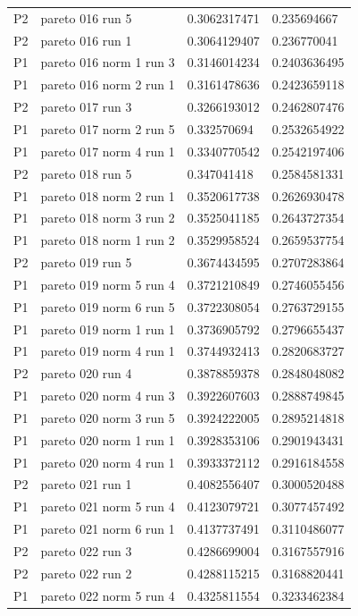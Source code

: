 \begin{tabular}{@{}llll@{}}
P2 & pareto 016 run 5 & 0.3062317471 & 0.235694667 \\
P2 & pareto 016 run 1 & 0.3064129407 & 0.236770041 \\
P1 & pareto 016 norm 1 run 3 & 0.3146014234 & 0.2403636495 \\
P1 & pareto 016 norm 2 run 1 & 0.3161478636 & 0.2423659118 \\
P2 & pareto 017 run 3 & 0.3266193012 & 0.2462807476 \\
P1 & pareto 017 norm 2 run 5 & 0.332570694 & 0.2532654922 \\
P1 & pareto 017 norm 4 run 1 & 0.3340770542 & 0.2542197406 \\
P2 & pareto 018 run 5 & 0.347041418 & 0.2584581331 \\
P1 & pareto 018 norm 2 run 1 & 0.3520617738 & 0.2626930478 \\
P1 & pareto 018 norm 3 run 2 & 0.3525041185 & 0.2643727354 \\
P1 & pareto 018 norm 1 run 2 & 0.3529958524 & 0.2659537754 \\
P2 & pareto 019 run 5 & 0.3674434595 & 0.2707283864 \\
P1 & pareto 019 norm 5 run 4 & 0.3721210849 & 0.2746055456 \\
P1 & pareto 019 norm 6 run 5 & 0.3722308054 & 0.2763729155 \\
P1 & pareto 019 norm 1 run 1 & 0.3736905792 & 0.2796655437 \\
P1 & pareto 019 norm 4 run 1 & 0.3744932413 & 0.2820683727 \\
P2 & pareto 020 run 4 & 0.3878859378 & 0.2848048082 \\
P1 & pareto 020 norm 4 run 3 & 0.3922607603 & 0.2888749845 \\
P1 & pareto 020 norm 3 run 5 & 0.3924222005 & 0.2895214818 \\
P1 & pareto 020 norm 1 run 1 & 0.3928353106 & 0.2901943431 \\
P1 & pareto 020 norm 4 run 1 & 0.3933372112 & 0.2916184558 \\
P2 & pareto 021 run 1 & 0.4082556407 & 0.3000520488 \\
P1 & pareto 021 norm 5 run 4 & 0.4123079721 & 0.3077457492 \\
P1 & pareto 021 norm 6 run 1 & 0.4137737491 & 0.3110486077 \\
P2 & pareto 022 run 3 & 0.4286699004 & 0.3167557916 \\
P2 & pareto 022 run 2 & 0.4288115215 & 0.3168820441 \\
P1 & pareto 022 norm 5 run 4 & 0.4325811554 & 0.3233462384 \\

\end{tabular}
